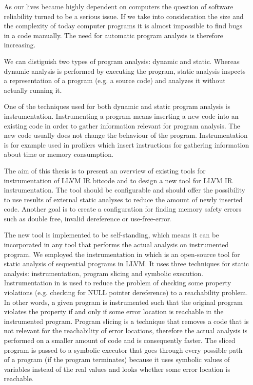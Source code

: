 As our lives became highly dependent on computers the question of software
reliability turned to be a serious issue. If we take into consideration the
size and the complexity of today computer programs it is almost impossible to
find bugs in a code manually. The need for automatic program analysis is
therefore increasing.

We can distiguish two types of program analysis: dynamic and static. Whereas
dynamic analysis is performed by executing the program, static analysis
inspects a representation of a program (e.g. a source code) and analyzes it
without actually running it.

One of the techniques used for both dynamic and static program analysis is
instrumentation. Instrumenting a program means inserting a new code into an
existing code in order to gather information relevant for program analysis. The
new code usually does not change the behaviour of the program. Instrumentation
is for example used in profilers which insert instructions for gathering
information about time or memory consumption. 

The aim of this thesis is to present an overview of existing tools for
instrumentation of LLVM IR bitcode and to design a new tool for LLVM IR
instrumentation. The tool should be configurable and should offer the
possibility to use results of external static analyses to reduce the amount of
newly inserted code. Another goal is to create a configuration for finding
memory safety errors such as double free, invalid dereference or
use-free-error.

The new tool is implemented to be self-standing, which means it can be
incorporated in any tool that performs the actual analysis on instrumented
program. We employed the instrumentation in \symbiotic which is an open-source
tool for static analysis of sequential programs in LLVM. It uses three
techniques for static analysis: instrumentation, program slicing and symbolic
execution. Instrumentation in \symbiotic is used to reduce the problem of
checking some property violations (e.g. checking for NULL pointer dereference)
to a reachability problem. In other words, a given program is instrumented such
that the original program violates the property if and only if some error
location is reachable in the instrumented program. Program slicing is a
technique that removes a code that is not relevant for the reachability of
error locations, therefore the actual analysis is performed on a smaller amount
of code and is consequently faster. The sliced program is passed to a symbolic
executor that goes through every possible path of a program (if the program
terminates) because it uses symbolic values of variables instead of the real
values and looks whether some error location is reachable.


